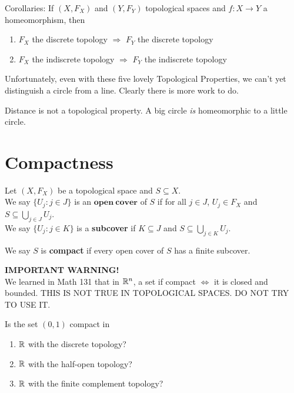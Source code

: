 Corollaries: If $(X, F_X) $ and $(Y, F_Y)$ topological spaces and $f: X \rightarrow Y$ a homeomorphism, then 
\begin{enumerate}
	\item $F_X$ the discrete topology $\Longrightarrow$ $F_Y$ the discrete topology 
	\item $F_X$ the indiscrete topology $\Longrightarrow$ $F_Y$ the indiscrete topology 
\end{enumerate}

Unfortunately, even with these five lovely Topological Properties, we can't yet distinguish a circle from a line. Clearly there is more work to do. 
\begin{example}
	 Distance is not a topological property. A big circle \emph{is} homeomorphic to a little circle. 
\end{example}

\section{Compactness} 
\begin{definition}
	Let $(X, F_X)$ be a topological space and $S \subseteq X$.\\
	We say $\{U_j : j \in J\}$ is an $\mathbf{open \ cover}$ of $S$ if for all $j \in J$, $U_j \in F_X$ and $S \subseteq \bigcup_{j \in J}U_j$.\\
	We say $\{U_j : j \in K\}$ is a \textbf{subcover} if $K \subseteq J$ and $S \subseteq \bigcup_{j \in K} U_j$.
	
	We say $S$ is \textbf{compact} if every open cover of $S$ has a finite subcover. 
\end{definition}

\textbf{IMPORTANT WARNING!}\\
We learned in Math 131 that in $\mathbb R^{n}$, a set if compact $\Longleftrightarrow$ it is closed and bounded. THIS IS NOT TRUE IN TOPOLOGICAL SPACES. DO NOT TRY TO USE IT. 
\begin{example}
	Is the set $(0,1)$ compact in 
	\begin{enumerate}
		\item $\mathbb R$ with the discrete topology? 
		\item $\mathbb R$ with the half-open topology? 
		\item $\mathbb R$ with the finite complement topology? 
	\end{enumerate}
\end{example}

